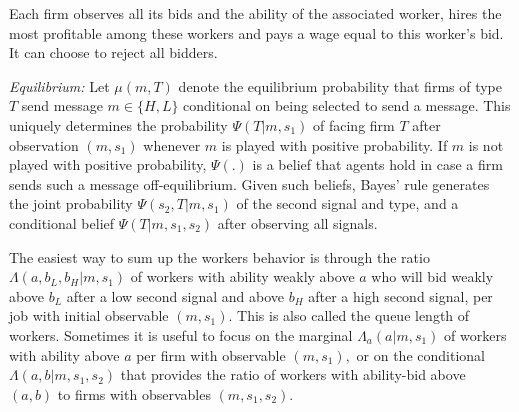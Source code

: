 \documentclass[12pt]{article}
\theoremstyle{plain}
\begin{document}
Each firm observes all its bids and the ability of the associated worker,
hires the most profitable among these workers and pays a wage equal to this
worker's bid. It can choose to reject all bidders.

\textit{Equilibrium: }Let $\mu (m,T)$ denote the equilibrium probability
that firms of type $T$ send message $m\in \{H,L\}$ conditional on being
selected to send a message. This uniquely determines the probability $\Psi
(T|m,s_{1})$ of facing firm $T$ after observation $(m,s_{1})$ whenever $m$
is played with positive probability. If $m$ is not played with positive
probability, $\Psi (.)$ is a belief that agents hold in case a firm sends
such a message off-equilibrium. Given such beliefs, Bayes' rule generates
the joint probability $\Psi (s_{2},T|m,s_{1})$ of the second signal and
type, and a conditional belief $\Psi (T|m,s_{1},s_{2})$ after observing all
signals.

The easiest way to sum up the workers behavior is through the ratio $\Lambda
(a,b_{L},b_{H}|m,s_{1})$ of workers with ability weakly above $a$ who will
bid weakly above $b_{L}$ after a low second signal and above $b_{H}$ after a
high second signal, per job with initial observable $(m,s_{1}).$ This is
also called the queue length of workers. Sometimes it is useful to focus on
the marginal $\Lambda _{a}(a|m,s_{1})$ of workers with ability above $a$ per
firm with observable $(m,s_{1}),$ or on the conditional $\Lambda
(a,b|m,s_{1},s_{2})$ that provides the ratio of workers with ability-bid
above $(a,b)$ to firms with observables $(m,s_{1},s_{2}).$
\end{document}

